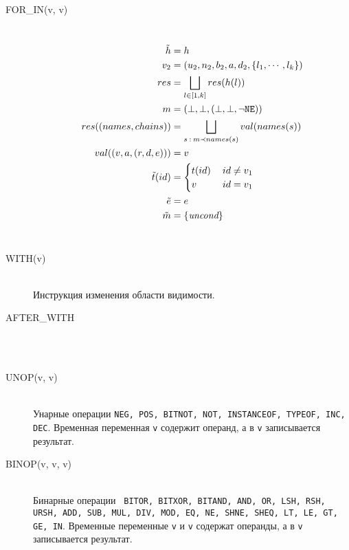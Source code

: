 \begin{description}
  \item[{\small\ttfamily FOR\_IN(v, v)}] ~\\%
  \[
  \begin{aligned}
    \tilde{h} &= h\\
    v_2 &= (u_2, n_2, b_2, a, d_2, \{l_1, \cdots, l_k\}) \\
    res &= \bigsqcup_{\substack{l\in[1,k]}} res(h(l)) \\
    m &= (\bot, \bot, (\bot, \bot, \lnot \mathtt{NE})) \\
    res( (names, chains)) &= \bigsqcup_{\substack{s \: : \: m \prec names(s)}} val(names(s)) \\
    val( (v, a, (r, d, e))) &= v \\
    \tilde{t}(id) &= 
      \begin{cases}
	t(id) &\: id \neq v_1 \\
	v &\: id = v_1 \\
      \end{cases}\\
    \tilde{e} &= e \\
    \tilde{m} &= \{\emph{uncond}\} \\
  \end{aligned}
  \]
  \\
   
  \item[{\small\ttfamily WITH(v)}] ~\\%
  Инструкция изменения области видимости.
  \\
   
  \item[{\small\ttfamily AFTER\_WITH}] ~\\%
  \\
   
  \item[{\small\ttfamily UNOP(v, v)}] ~\\%
  Унарные операции \texttt{NEG, POS, BITNOT, NOT, INSTANCEOF, TYPEOF,
  INC, DEC}. Временная переменная \texttt{v} содержит операнд, а в
  \texttt{v} записывается результат.
  \\
   
  \item[{\small\ttfamily BINOP(v, v, v)}] ~\\%
  Бинарные операции \texttt{ BITOR, BITXOR, BITAND, AND, OR, LSH, RSH,
  URSH, ADD, SUB, MUL, DIV, MOD, EQ, NE, SHNE, SHEQ, LT, LE, GT, GE,
  IN}. Временные переменные \texttt{v} и \texttt{v} содержат
  операнды, а в \texttt{v} записывается результат.
  \\
   

\end{description}
